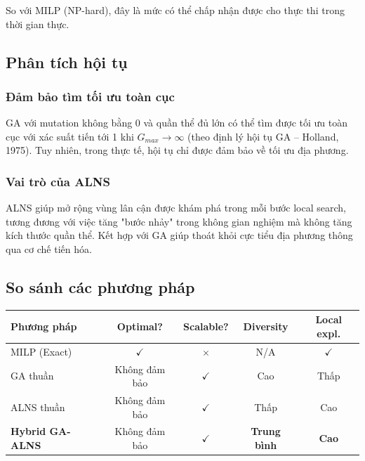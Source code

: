 So với MILP (NP-hard), đây là mức có thể chấp nhận được cho thực thi trong thời gian thực.

\subsection{Phân tích hội tụ}

\subsubsection*{Đảm bảo tìm tối ưu toàn cục}

GA với mutation không bằng 0 và quần thể đủ lớn có thể tìm được tối ưu toàn cục với xác suất tiến tới 1 khi $G_{max} \to \infty$ (theo định lý hội tụ GA -- Holland, 1975). Tuy nhiên, trong thực tế, hội tụ chỉ được đảm bảo về tối ưu địa phương.

\subsubsection*{Vai trò của ALNS}

ALNS giúp mở rộng vùng lân cận được khám phá trong mỗi bước local search, tương đương với việc tăng "bước nhảy" trong không gian nghiệm mà không tăng kích thước quần thể. Kết hợp với GA giúp thoát khỏi cực tiểu địa phương thông qua cơ chế tiến hóa.

\subsection{So sánh các phương pháp}

\begin{center}
\begin{tabular}{p{}cccc}
\toprule
\textbf{Phương pháp} & \textbf{Optimal?} & \textbf{Scalable?} & \textbf{Diversity} & \textbf{Local expl.} \\
\midrule
MILP (Exact) & $\checkmark$ & $\times$ & N/A & $\checkmark$ \\
GA thuần & Không đảm bảo & $\checkmark$ & Cao & Thấp \\
ALNS thuần & Không đảm bảo & $\checkmark$ & Thấp & Cao \\
\textbf{Hybrid GA-ALNS} & Không đảm bảo & $\checkmark$ & \textbf{Trung bình} & \textbf{Cao} \\
\bottomrule
\end{tabular}
\end{center}
